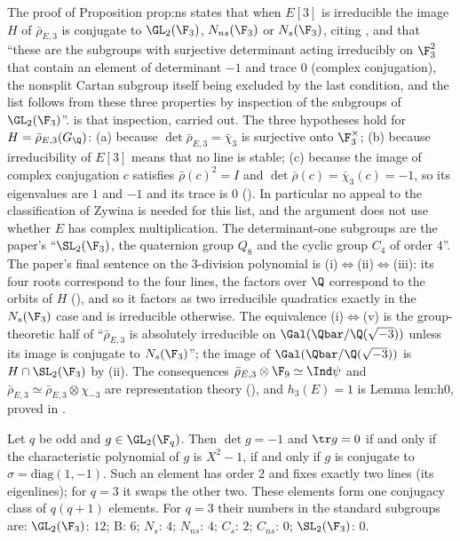 \begin{paperlink}
The proof of Proposition prop:ns states that when $E[3]$ is irreducible the image $H$ of $\bar\rho_{E,3}$ is conjugate to $\GL_2(\F_3)$, $N_{ns}(\F_3)$ or $N_s(\F_3)$, citing
\cite{Zywina15}, and that ``these are the subgroups with surjective determinant acting irreducibly on $\F_3^2$ that contain an element of determinant $-1$ and trace
$0$ (complex conjugation), the nonsplit Cartan subgroup itself being excluded by the last condition, and the list follows from these three properties by
inspection of the subgroups of $\GL_2(\F_3)$''.  is that inspection, carried out. The three hypotheses hold for $H=\bar\rho_{E,3}(G_\Q)$:
(a) because $\det\bar\rho_{E,3}=\bar\chi_3$ is surjective onto $\F_3^\times$; (b) because irreducibility of $E[3]$ means that no line is stable; (c) because the image of complex
conjugation $c$ satisfies $\bar\rho(c)^2=I$ and $\det\bar\rho(c)=\bar\chi_3(c)=-1$, so its eigenvalues are $1$ and $-1$ and its trace is $0$ (). In particular no
appeal to the classification of Zywina is needed for this list, and the argument does not use whether $E$ has complex multiplication. The determinant-one
subgroups are the paper's ``$\SL_2(\F_3)$, the quaternion group $Q_8$ and the cyclic group $C_4$ of order $4$''. The paper's final sentence on the $3$-division polynomial
is (i)$\Leftrightarrow$(ii)$\Leftrightarrow$(iii): its four roots correspond to the four lines, the factors over $\Q$ correspond to the orbits of $H$
(), and so it factors as two irreducible quadratics exactly in the $N_s(\F_3)$ case and is irreducible otherwise. The equivalence (i)$\Leftrightarrow$(v) is the
group-theoretic half of ``$\bar\rho_{E,3}$ is absolutely irreducible on $\Gal(\Qbar/\Q(\sqrt{-3}))$ unless its image is conjugate to $N_s(\F_3)$''; the image of
$\Gal(\Qbar/\Q(\sqrt{-3}))$ is $H\cap\SL_2(\F_3)$ by (ii). The consequences $\bar\rho_{E,3}\otimes\F_9\simeq\Ind\psi$ and
$\bar\rho_{E,3}\simeq\bar\rho_{E,3}\otimes\chi_{-3}$ are representation theory (), and $h_3(E)=1$ is Lemma lem:h0, proved in .
\end{paperlink}

\begin{proposition}\label{prop:groups:cc}
Let $q$ be odd and $g\in\GL_2(\F_q)$. Then $\det g=-1$ and $\tr g=0$ if and only if the characteristic polynomial of $g$ is $X^2-1$, if and only if $g$ is conjugate to
$\sigma=\mathrm{diag}(1,-1)$. Such an element has order $2$ and fixes exactly two lines (its eigenlines); for $q=3$ it swaps the other two. These elements form one
conjugacy class of $q(q+1)$ elements. For $q=3$ their numbers in the standard subgroups are: $\GL_2(\F_3)$: $12$; $\mathrm B$: $6$; $N_s$: $4$; $N_{ns}$: $4$; $C_s$: $2$; $C_{ns}$: $0$;
$\SL_2(\F_3)$: $0$.
\end{proposition}

